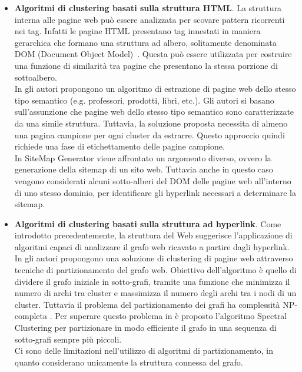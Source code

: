 \begin{itemize}
\item \textbf{Algoritmi di clustering basati sulla struttura HTML}.
La struttura interna alle pagine web può essere analizzata per scovare pattern ricorrenti nei tag. Infatti le pagine HTML presentano tag innestati in maniera gerarchica che formano una struttura ad albero, solitamente denominata DOM (Document Object Model)~\cite{Marini02}. Questa può essere utilizzata per costruire una funzione di similarità tra pagine che presentano la stessa porzione di sottoalbero.
\\
In \cite{Crescenzi05} gli autori propongono un algoritmo di estrazione di pagine web dello stesso tipo semantico (e.g. professori, prodotti, libri, etc.). Gli autori si basano sull'assunzione che pagine web dello stesso tipo semantico sono caratterizzate da una simile struttura.
Tuttavia, la soluzione proposta necessita di almeno una pagina campione per ogni cluster da estrarre. Questo approccio quindi richiede una fase di etichettamento delle pagine campione.%
\\
In SiteMap Generator \cite{Lin11} viene affrontato un argomento diverso, ovvero la generazione della sitemap di un sito web. Tuttavia anche in questo caso vengono considerati alcuni sotto-alberi del DOM delle pagine web all'interno di uno stesso dominio, per identificare gli hyperlink necessari a determinare la sitemap.  

\item \textbf{Algoritmi di clustering basati sulla struttura ad hyperlink}. Come introdotto precedentemente, la struttura del Web suggerisce l'applicazione di algoritmi capaci di analizzare il grafo web ricavato a partire dagli hyperlink. In \cite{Luxburg07} gli autori propongono una soluzione di clustering di pagine web attraverso tecniche di partizionamento del grafo web. Obiettivo dell'algoritmo è quello di dividere il grafo iniziale in sotto-grafi, tramite una funzione che minimizza il numero di archi tra cluster e massimizza il numero degli archi tra i nodi di un cluster.
Tuttavia il problema del partizionamento dei grafi ha complessità NP-completa \cite{Garey}. 
Per superare questo problema in \cite{Banos03} è proposto l'algoritmo Spectral Clustering per partizionare in modo efficiente il grafo in una sequenza di sotto-grafi sempre più piccoli. 
\\
Ci sono delle limitazioni nell'utilizzo di algoritmi di partizionamento, in quanto considerano unicamente la struttura connessa del grafo.
\end{itemize}

